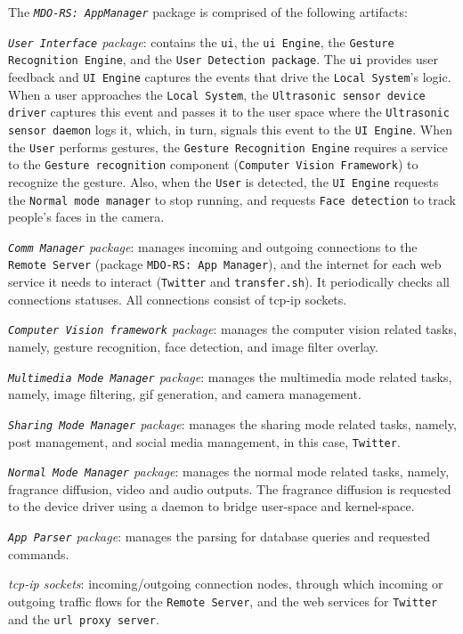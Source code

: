 \vspace{1em}
The \emph{\texttt{MDO-RS: AppManager}} package is comprised of the following artifacts:
\begin{item-c}
\item
  \emph{\texttt{User Interface} package}: contains the \texttt{\gls{ui}}, the
  \texttt{\gls{ui} Engine}, the \texttt{Gesture Recognition Engine}, and the
  \texttt{User Detection package}. The \texttt{\gls{ui}} provides user feedback
  and \texttt{UI Engine}
  captures the events that drive the \texttt{Local System}'s logic. When a user
  approaches the \texttt{Local System}, the \texttt{Ultrasonic sensor device
    driver} captures this event and passes it to the user space where the
  \texttt{Ultrasonic sensor daemon} logs it, which, in turn, signals this event
  to the \texttt{UI Engine}. When the \texttt{User} performs gestures, the
  \texttt{Gesture Recognition Engine} requires a service to the \texttt{Gesture
    recognition} component (\texttt{Computer Vision Framework}) to recognize the
  gesture. Also, when the \texttt{User} is detected, the \texttt{UI Engine}
  requests the \texttt{Normal mode manager} to stop running, and requests
  \texttt{Face detection} to track people's faces in the camera.
\item
  \emph{\texttt{Comm Manager} package}: manages incoming and outgoing
  connections to the \texttt{Remote Server} (package \texttt{MDO-RS: App
    Manager}),  and the internet for each web service it needs to interact
  (\texttt{Twitter} and \texttt{transfer.sh}).
  It periodically checks all connections statuses. All connections
  consist of \gls{tcp-ip} sockets.
\item
  \emph{\texttt{Computer Vision framework} package}: manages the computer vision
  related tasks, namely, gesture recognition, face detection, and image filter
  overlay.
\item 
  \emph{\texttt{Multimedia Mode Manager} package}: manages the multimedia mode
  related tasks, namely, image filtering, \gls{gif} generation, and camera
  management.
\item 
  \emph{\texttt{Sharing Mode Manager} package}: manages the sharing mode
  related tasks, namely, post management, and social media management, in this
  case, \texttt{Twitter}.
\item 
  \emph{\texttt{Normal Mode Manager} package}: manages the normal mode
  related tasks, namely, fragrance diffusion, video and audio outputs. The
  fragrance diffusion is requested to the device driver using a daemon to bridge
  user-space and kernel-space.
\item 
  \emph{\texttt{App Parser} package}: manages the parsing for database queries
  and requested commands.
\item
  \emph{\gls{tcp-ip} sockets}: incoming/outgoing connection nodes, through which
  incoming or outgoing traffic flows for the \texttt{Remote Server}, and the web
  services for \texttt{Twitter} and the \texttt{\gls{url} proxy server}.
\end{item-c}
%
%

